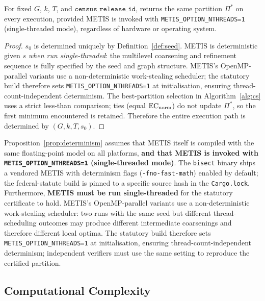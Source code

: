 \begin{proposition}[Determinism]
\label{prop:determinism}
For fixed $G$, $k$, $T$, and $\mathtt{census\_release\_id}$, \cs{} returns
the same partition $\Pi^*$ on every execution, provided METIS is invoked with
\texttt{METIS\_OPTION\_NTHREADS=1} (single-threaded mode), regardless of
hardware or operating system.
\end{proposition}

\begin{proof}
$s_0$ is determined uniquely by Definition~\ref{def:seed}.
METIS is deterministic given $s$ \emph{when run single-threaded}: the
multilevel coarsening and refinement sequence is fully specified by the seed
and graph structure.
METIS's OpenMP-parallel variants use a non-deterministic work-stealing
scheduler; the statutory build therefore sets \texttt{METIS\_OPTION\_NTHREADS=1}
at initialisation, ensuring thread-count-independent determinism.
The best-partition selection in Algorithm~\ref{alg:cs} uses a strict less-than
comparison; ties (equal $\mathrm{EC}_{\mathrm{norm}}$) do not update $\Pi^*$, so the first
minimum encountered is retained.
Therefore the entire execution path is determined by $(G, k, T, s_0)$.
\end{proof}

\begin{remark}
Proposition~\ref{prop:determinism} assumes that METIS itself is compiled with
the same floating-point model on all platforms, \textbf{and that METIS is
invoked with \texttt{METIS\_OPTION\_NTHREADS=1} (single-threaded mode)}.
The \texttt{bisect} binary ships a vendored METIS with determinism flags
(\texttt{-fno-fast-math}) enabled by default; the federal-statute build is
pinned to a specific source hash in the \texttt{Cargo.lock}.
Furthermore, \textbf{METIS must be run single-threaded} for the statutory
certificate to hold.
METIS's OpenMP-parallel variants use a non-deterministic work-stealing
scheduler: two runs with the same seed but different thread-scheduling
outcomes may produce different intermediate coarsenings and therefore
different local optima.
The statutory build therefore sets \texttt{METIS\_OPTION\_NTHREADS=1} at
initialisation, ensuring thread-count-independent determinism; independent
verifiers must use the same setting to reproduce the certified partition.
\end{remark}

\subsection{Computational Complexity}

